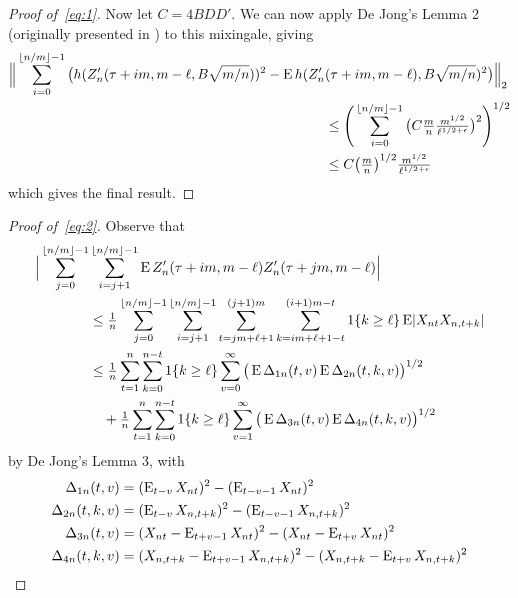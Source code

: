 \documentclass[11pt]{article}
\begin{document}
{\begin{proof}[Proof of~\eqref{eq:1}]
  Now let $C = 4 B D D'$.
  We can now apply De Jong's Lemma 2 (originally presented in
  \citealp{Mcl:75}) to this mixingale, giving
  \begin{align*}
    \Big \lVert \sum_{i=0}^{\lfloor n/m \rfloor - 1}
    \big(h(Z'_n(\tau + im, m - \ell, B \sqrt{m/n}))^2 -
    \operatorname{E} h(Z'_n&(\tau + im, m - \ell), B \sqrt{m/n})^2\big) \Big\rVert_2 \\
    &\leq \Bigg(\sum_{i=0}^{\lfloor n/m \rfloor - 1}
    \big(C \tfrac{m}{n} \tfrac{m^{1/2}}{\ell^{1/2 + \epsilon}}\big)^2 \Bigg)^{1/2} \\
    &\leq C \big(\tfrac{m}{n}\big)^{1/2} \tfrac{m^{1/2}}{\ell^{1/2 + \epsilon}}
  \end{align*}
  which gives the final result.
\end{proof}

\begin{proof}[Proof of~\eqref{eq:2}]
  Observe that
  \begin{align}
    \Big\lvert \notag
    \sum_{j=0}^{\lfloor n/m \rfloor - 1} & \sum_{i=j+1}^{\lfloor n/m \rfloor - 1}
    \operatorname{E} Z_{n}'(\tau + im, m - \ell) Z_{n}'(\tau + jm, m - \ell) \Big\rvert \\
    &\leq \tfrac{1}{n} \notag
    \sum_{j=0}^{\lfloor n/m \rfloor - 1} \sum_{i=j+1}^{\lfloor n/m \rfloor - 1}
    \sum_{t = j m + \ell + 1}^{(j+1) m} \sum_{k= i m + \ell + 1 - t}^{(i+1)m - t}
    1\{k \geq \ell\} \operatorname{E}\lvert X_{nt} X_{n,t+k}  \rvert\\ \label{eq:3}
    &\leq \tfrac{1}{n} \sum_{t = 1}^n \sum_{k = 0}^{n-t} 1\{k \geq \ell\}
    \sum_{v=0}^\infty  \big( \operatorname{E} \Delta_{1n}(t,v) \operatorname{E} \Delta_{2n}(t,k,v) \big)^{1/2}\\
    &\quad + \tfrac{1}{n} \sum_{t = 1}^n \sum_{k = 0}^{n-t} 1\{k \geq \ell\} \label{eq:4}
    \sum_{v=1}^\infty \big( \operatorname{E} \Delta_{3n}(t,v) \operatorname{E} \Delta_{4n}(t,k,v) \big)^{1/2}
  \end{align}
  by De Jong's Lemma 3, with
  \begin{align*}
    \Delta_{1n}(t,v) &= (\operatorname{E}_{t-v} X_{nt})^2 - (\operatorname{E}_{t-v-1} X_{nt})^2 \\
    \Delta_{2n}(t,k,v)&= (\operatorname{E}_{t-v}X_{n,t+k})^2 - (\operatorname{E}_{t-v-1} X_{n,t+k})^2 \\
    \Delta_{3n}(t,v) &=  (X_{nt} - \operatorname{E}_{t+v-1} X_{nt})^2 -  (X_{nt} - \operatorname{E}_{t+v} X_{nt})^2 \\
    \Delta_{4n}(t,k,v) &= (X_{n,t+k} - \operatorname{E}_{t+v-1} X_{n,t+k})^2 - (X_{n,t+k} - \operatorname{E}_{t+v} X_{n,t+k})^2
  \end{align*}


\end{proof}}
\end{document}
